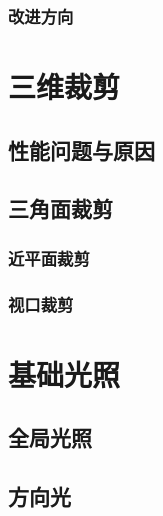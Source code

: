 \documentclass[12pt,oneside,a4paper]{ctexart}
\begin{document}
\subsubsection{改进方向}
\newpage
\section{三维裁剪}
\subsection{性能问题与原因}
\subsection{三角面裁剪}
\subsubsection{近平面裁剪}
\subsubsection{视口裁剪}
\section{基础光照}
\subsection{全局光照}
\subsection{方向光}
\end{document}
